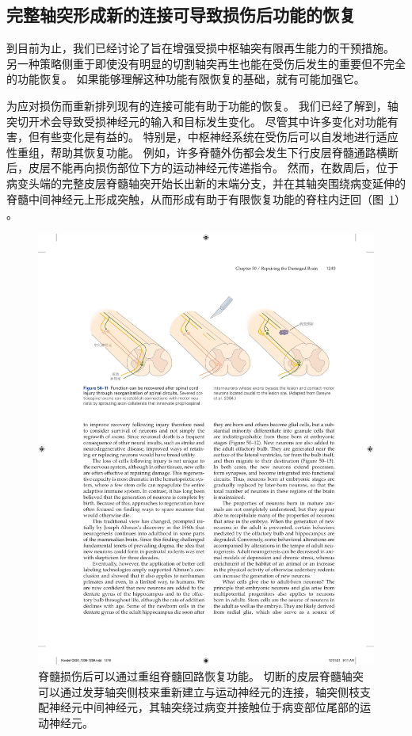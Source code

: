 \subsection{完整轴突形成新的连接可导致损伤后功能的恢复}

到目前为止，我们已经讨论了旨在增强受损中枢轴突有限再生能力的干预措施。
另一种策略侧重于即使没有明显的切割轴突再生也能在受伤后发生的重要但不完全的功能恢复。
如果能够理解这种功能有限恢复的基础，就有可能加强它。


为应对损伤而重新排列现有的连接可能有助于功能的恢复。
我们已经了解到，轴突切开术会导致受损神经元的输入和目标发生变化。
尽管其中许多变化对功能有害，但有些变化是有益的。
特别是，中枢神经系统在受伤后可以自发地进行适应性重组，帮助其恢复功能。
例如，许多脊髓外伤都会发生下行皮层脊髓通路横断后，皮层不能再向损伤部位下方的运动神经元传递指令。
然而，在数周后，位于病变头端的完整皮层脊髓轴突开始长出新的末端分支，并在其轴突围绕病变延伸的脊髓中间神经元上形成突触，从而形成有助于有限恢复功能的脊柱内迂回（图~\ref{fig:50_11}） 。



\begin{figure}[htbp]
	\centering
	\includegraphics[width=0.95\linewidth]{chap50/fig_50_11}
	\caption{脊髓损伤后可以通过重组脊髓回路恢复功能。
		切断的皮层脊髓轴突可以通过发芽轴突侧枝来重新建立与运动神经元的连接，轴突侧枝支配神经元中间神经元，其轴突绕过病变并接触位于病变部位尾部的运动神经元\cite{bareyre2004injured}。}
	\label{fig:50_11}
\end{figure}


